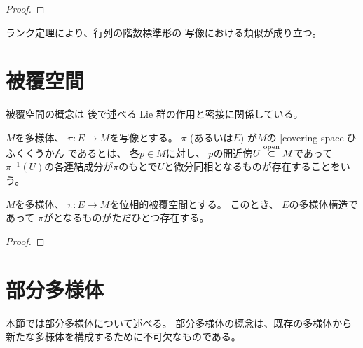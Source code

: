 \documentclass[report]{jlreq}
\begin{document}
\begin{proof}
    \TODO{}
\end{proof}

ランク定理により、行列の階数標準形の
{\smooth}写像における類似が成り立つ。

\begin{theorem}[ランク定理]
    \TODO{}
\end{theorem}



%
\section{被覆空間}

被覆空間の概念は
後で述べる Lie 群の作用と密接に関係している。

\begin{definition}[被覆空間]
    $M$を多様体、
    $\pi \colon E \to M$を{\smooth}写像とする。
    $\pi$ (あるいは$E$) が$M$の
    [covering space]{ひふくくうかん}
    であるとは、
    各$p \in M$に対し、
    $p$の開近傍$U \stackrel{\text{open}}{\subset} M$であって
    $\pi^{-1}(U)$の各連結成分が$\pi$のもとで$U$と微分同相となるものが存在することをいう。
\end{definition}

\begin{proposition}
    $M$を多様体、
    $\pi \colon E \to M$を位相的被覆空間とする。
    このとき、
    $E$の多様体構造であって
    $\pi$が{\smooth}となるものがただひとつ存在する。
\end{proposition}

\begin{proof}
    \TODO{}
\end{proof}



%
\section{部分多様体}

本節では部分多様体について述べる。
部分多様体の概念は、既存の多様体から新たな多様体を構成するために不可欠なものである。
\end{document}
